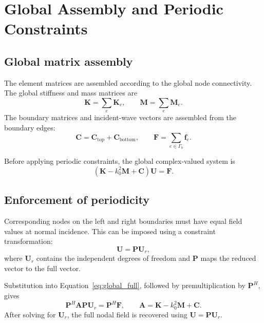 \documentclass{article}
\begin{document}
\chapter{Global Assembly and Periodic Constraints}

\section{Global matrix assembly}

The element matrices are assembled according to the global node
connectivity. The global stiffness and mass matrices are
\begin{equation}
    \mathbf{K}=\sum_e\mathbf{K}_e,
    \qquad
    \mathbf{M}=\sum_e\mathbf{M}_e.
\end{equation}
The boundary matrices and incident-wave vectors are assembled from
the boundary edges:
\begin{equation}
    \mathbf{C}=\mathbf{C}_{\mathrm{top}}
              +\mathbf{C}_{\mathrm{bottom}},
    \qquad
    \mathbf{F}=\sum_{e\in\Gamma_b}\mathbf{f}_e.
\end{equation}

Before applying periodic constraints, the global complex-valued
system is
\begin{equation}
    \left(\mathbf{K}-k_0^2\mathbf{M}+\mathbf{C}\right)
    \mathbf{U}=\mathbf{F}.
    \label{eq:global_full}
\end{equation}

\section{Enforcement of periodicity}

Corresponding nodes on the left and right boundaries must have equal
field values at normal incidence. This can be imposed using a
constraint transformation:
\begin{equation}
    \mathbf{U}=\mathbf{P}\mathbf{U}_r,
\end{equation}
where $\mathbf{U}_r$ contains the independent degrees of freedom and
$\mathbf{P}$ maps the reduced vector to the full vector.

Substitution into Equation~\eqref{eq:global_full}, followed by
premultiplication by $\mathbf{P}^H$, gives
\begin{equation}
    \boxed{
    \mathbf{P}^H\mathbf{A}\mathbf{P}\mathbf{U}_r
    =\mathbf{P}^H\mathbf{F},
    \qquad
    \mathbf{A}=\mathbf{K}-k_0^2\mathbf{M}+\mathbf{C}.
    }
    \label{eq:reduced_system}
\end{equation}
After solving for $\mathbf{U}_r$, the full nodal field is recovered
using $\mathbf{U}=\mathbf{P}\mathbf{U}_r$.
\end{document}
